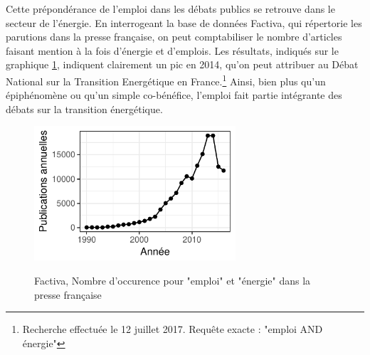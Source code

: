 Cette prépondérance de l'emploi dans les débats publics se retrouve dans le secteur de l'énergie. 
En interrogeant la base de données Factiva, qui répertorie les parutions dans la presse française, on peut comptabiliser le nombre d'articles faisant mention à la fois d'énergie et d'emplois. 
Les résultats, indiqués sur le graphique \ref{fig:Factiva}, indiquent clairement un pic en 2014, qu'on peut attribuer au Débat National sur la Transition Energétique en France.\footnote{Recherche effectuée le 12 juillet 2017. Requête exacte : "emploi AND énergie"} 
Ainsi, bien plus qu’un épiphénomène ou qu’un simple co-bénéfice, l’emploi fait partie intégrante des débats sur la transition énergétique. 

\begin{figure}[h!]
	\centering
	\caption{Factiva, Nombre d'occurence pour "emploi" et "énergie" dans la presse française}
	\includegraphics[height=5cm]{figures/Factiva.pdf}
	\label{fig:Factiva}
\end{figure}


